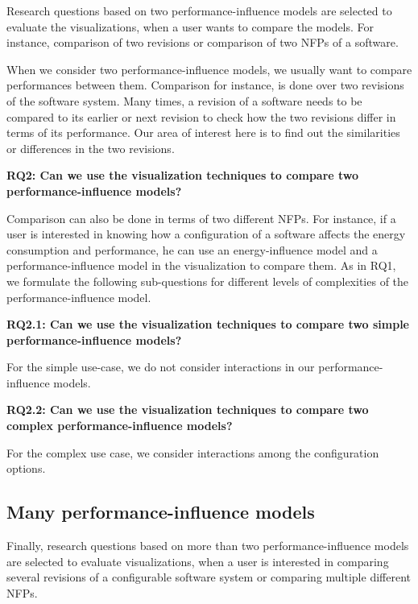 Research questions based on two performance-influence models are selected to evaluate the visualizations, when a user wants to compare the models. For instance, comparison of two revisions or comparison of two NFPs of a software.

When we consider two performance-influence models, we usually want to compare performances between them. Comparison for instance, is done over two revisions of the software system. Many times, a revision of a software needs to be compared to its earlier or next revision to check how the two revisions differ in terms of its performance. Our area of interest here is to find out the similarities or differences in the two revisions.

\begin{mdframed}
\textbf{RQ2: Can we use the visualization techniques to compare two performance-influence models?}
\end{mdframed}

Comparison can also be done in terms of two different NFPs. For instance, if a user is interested in knowing how a configuration of a software affects the energy consumption and performance, he can use an energy-influence model and a performance-influence model in the visualization to compare them. As in RQ1, we formulate the following sub-questions for different levels of complexities of the performance-influence model.

\begin{mdframed}
\textbf{RQ2.1: Can we use the visualization techniques to compare two simple performance-influence models?}
\end{mdframed}

For the simple use-case, we do not consider interactions in our performance-influence models.

\begin{mdframed}
\textbf{RQ2.2: Can we use the visualization techniques to compare two complex performance-influence models?}
\end{mdframed}

For the complex use case, we consider interactions among the configuration options.

\subsection{Many performance-influence models}

Finally, research questions based on more than two performance-influence models are selected to evaluate visualizations, when a user is interested in comparing several revisions of a configurable software system or comparing multiple different NFPs.

